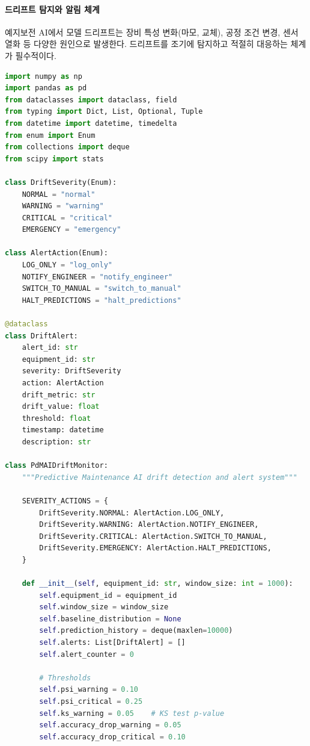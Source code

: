 \paragraph{드리프트 탐지와 알림 체계}

예지보전 AI에서 모델 드리프트는 장비 특성 변화(마모, 교체), 공정 조건 변경, 센서 열화 등 다양한 원인으로 발생한다. 드리프트를 조기에 탐지하고 적절히 대응하는 체계가 필수적이다.

\begin{lstlisting}[language=Python, caption={Predictive Maintenance AI Governance: Drift Detection and Alert System}, label={lst:pdm_drift}]
import numpy as np
import pandas as pd
from dataclasses import dataclass, field
from typing import Dict, List, Optional, Tuple
from datetime import datetime, timedelta
from enum import Enum
from collections import deque
from scipy import stats

class DriftSeverity(Enum):
    NORMAL = "normal"
    WARNING = "warning"
    CRITICAL = "critical"
    EMERGENCY = "emergency"

class AlertAction(Enum):
    LOG_ONLY = "log_only"
    NOTIFY_ENGINEER = "notify_engineer"
    SWITCH_TO_MANUAL = "switch_to_manual"
    HALT_PREDICTIONS = "halt_predictions"

@dataclass
class DriftAlert:
    alert_id: str
    equipment_id: str
    severity: DriftSeverity
    action: AlertAction
    drift_metric: str
    drift_value: float
    threshold: float
    timestamp: datetime
    description: str

class PdMAIDriftMonitor:
    """Predictive Maintenance AI drift detection and alert system"""

    SEVERITY_ACTIONS = {
        DriftSeverity.NORMAL: AlertAction.LOG_ONLY,
        DriftSeverity.WARNING: AlertAction.NOTIFY_ENGINEER,
        DriftSeverity.CRITICAL: AlertAction.SWITCH_TO_MANUAL,
        DriftSeverity.EMERGENCY: AlertAction.HALT_PREDICTIONS,
    }

    def __init__(self, equipment_id: str, window_size: int = 1000):
        self.equipment_id = equipment_id
        self.window_size = window_size
        self.baseline_distribution = None
        self.prediction_history = deque(maxlen=10000)
        self.alerts: List[DriftAlert] = []
        self.alert_counter = 0

        # Thresholds
        self.psi_warning = 0.10
        self.psi_critical = 0.25
        self.ks_warning = 0.05    # KS test p-value
        self.accuracy_drop_warning = 0.05
        self.accuracy_drop_critical = 0.10


\end{lstlisting}
